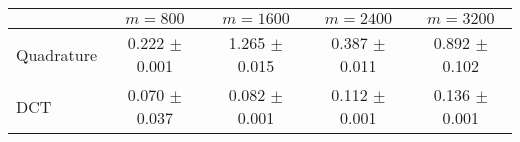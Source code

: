\centering
\renewcommand{\arraystretch}{1.2}
\begin{tabular}{@{}lcccc@{}}
\toprule
 & $m=800$ & $m=1600$ & $m=2400$ & $m=3200$\\
\midrule
Quadrature & 0.222 $\pm$ 0.001 & 1.265 $\pm$ 0.015 & 0.387 $\pm$ 0.011 & 0.892 $\pm$ 0.102 \\
DCT & 0.070 $\pm$ 0.037 & 0.082 $\pm$ 0.001 & 0.112 $\pm$ 0.001 & 0.136 $\pm$ 0.001 \\
\bottomrule
\end{tabular}
